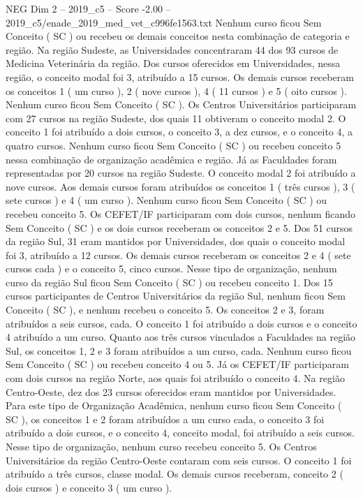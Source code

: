 \begin{textsample}{NEG Dim 2 – 2019\_c5 – Score -2.00 – 2019\_c5/enade\_2019\_med\_vet\_c996fe1563.txt}
Nenhum curso ficou Sem Conceito ( SC ) ou recebeu os demais conceitos nesta combinação de categoria e região.
Na região Sudeste, as Universidades concentraram 44 dos 93 cursos de Medicina Veterinária da região.
Dos cursos oferecidos em Universidades, nessa região, o conceito modal foi 3, atribuído a 15 cursos.
Os demais cursos receberam os conceitos 1 ( um curso ), 2 ( nove cursos ), 4 ( 11 cursos ) e 5 ( oito cursos ).
Nenhum curso ficou Sem Conceito ( SC ).
Os Centros Universitários participaram com 27 cursos na região Sudeste, dos quais 11 obtiveram o conceito modal 2.
O conceito 1 foi atribuído a dois cursos, o conceito 3, a dez cursos, e o conceito 4, a quatro cursos.
Nenhum curso ficou Sem Conceito ( SC ) ou recebeu conceito 5 nessa combinação de organização acadêmica e região.
Já as Faculdades foram representadas por 20 cursos na região Sudeste.
O conceito modal 2 foi atribuído a nove cursos.
Aos demais cursos foram atribuídos os conceitos 1 ( três cursos ), 3 ( sete cursos ) e 4 ( um curso ).
Nenhum curso ficou Sem Conceito ( SC ) ou recebeu conceito 5.
Os CEFET/IF participaram com dois cursos, nenhum ficando Sem Conceito ( SC ) e os dois cursos receberam os conceitos 2 e 5.
Dos 51 cursos da região Sul, 31 eram mantidos por Universidades, dos quais o conceito modal foi 3, atribuído a 12 cursos.
Os demais cursos receberam os conceitos 2 e 4 ( sete cursos cada ) e o conceito 5, cinco cursos.
Nesse tipo de organização, nenhum curso da região Sul ficou Sem Conceito ( SC ) ou recebeu conceito 1.
Dos 15 cursos participantes de Centros Universitários da região Sul, nenhum ficou Sem Conceito ( SC ), e nenhum recebeu o conceito 5.
Os conceitos 2 e 3, foram atribuídos a seis cursos, cada.
O conceito 1 foi atribuído a dois cursos e o conceito 4 atribuído a um curso.
Quanto aos três cursos vinculados a Faculdades na região Sul, os conceitos 1, 2 e 3 foram atribuídos a um curso, cada.
Nenhum curso ficou Sem Conceito ( SC ) ou recebeu conceito 4 ou 5.
Já os CEFET/IF participaram com dois cursos na região Norte, aos quais foi atribuído o conceito 4.
Na região Centro-Oeste, dez dos 23 cursos oferecidos eram mantidos por Universidades.
Para este tipo de Organização Acadêmica, nenhum curso ficou Sem Conceito ( SC ), os conceitos 1 e 2 foram atribuídos a um curso cada, o conceito 3 foi atribuído a dois cursos, e o conceito 4, conceito modal, foi atribuído a seis cursos.
Nesse tipo de organização, nenhum curso recebeu conceito 5.
Os Centros Universitários da região Centro-Oeste contaram com seis cursos.
O conceito 1 foi atribuído a três cursos, classe modal.
Os demais cursos receberam, conceito 2 ( dois cursos ) e conceito 3 ( um curso ).

\end{textsample}
